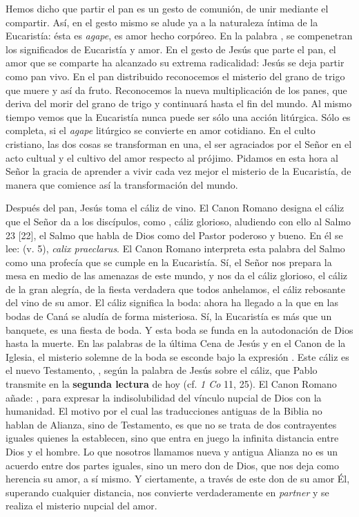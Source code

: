 \begin{body}
Hemos dicho que partir el pan es un gesto de comunión, de unir mediante el compartir. Así, en el gesto mismo se alude ya a la naturaleza íntima de la Eucaristía: ésta es \textit{agape}, es amor hecho corpóreo. En la palabra , se compenetran los significados de Eucaristía y amor. En el gesto de Jesús que parte el pan, el amor que se comparte ha alcanzado su extrema radicalidad: Jesús se deja partir como pan vivo. En el pan distribuido reconocemos el misterio del grano de trigo que muere y así da fruto. Reconocemos la nueva multiplicación de los panes, que deriva del morir del grano de trigo y continuará hasta el fin del mundo. Al mismo tiempo vemos que la Eucaristía nunca puede ser sólo una acción litúrgica. Sólo es completa, si el \textit{agape} litúrgico se convierte en amor cotidiano. En el culto cristiano, las dos cosas se transforman en una, el ser agraciados por el Señor en el acto cultual y el cultivo del amor respecto al prójimo. Pidamos en esta hora al Señor la gracia de aprender a vivir cada vez mejor el misterio de la Eucaristía, de manera que comience así la transformación del mundo.

Después del pan, Jesús toma el cáliz de vino. El Canon Romano designa el cáliz que el Señor da a los discípulos, como , cáliz glorioso, aludiendo con ello al Salmo 23 [22], el Salmo que habla de Dios como del Pastor poderoso y bueno. En él se lee:  (v. 5), \textit{calix praeclarus}. El Canon Romano interpreta esta palabra del Salmo como una profecía que se cumple en la Eucaristía. Sí, el Señor nos prepara la mesa en medio de las amenazas de este mundo, y nos da el cáliz glorioso, el cáliz de la gran alegría, de la fiesta verdadera que todos anhelamos, el cáliz rebosante del vino de su amor. El cáliz significa la boda: ahora ha llegado  a la que en las bodas de Caná se aludía de forma misteriosa. Sí, la Eucaristía es más que un banquete, es una fiesta de boda. Y esta boda se funda en la autodonación de Dios hasta la muerte. En las palabras de la última Cena de Jesús y en el Canon de la Iglesia, el misterio solemne de la boda se esconde bajo la expresión . Este cáliz es el nuevo Testamento, , según la palabra de Jesús sobre el cáliz, que Pablo transmite en la \textbf{segunda lectura} de hoy (cf. \textit{1 Co} 11, 25). El Canon Romano añade: , para expresar la indisolubilidad del vínculo nupcial de Dios con la humanidad. El motivo por el cual las traducciones antiguas de la Biblia no hablan de Alianza, sino de Testamento, es que no se trata de dos contrayentes iguales quienes la establecen, sino que entra en juego la infinita distancia entre Dios y el hombre. Lo que nosotros llamamos nueva y antigua Alianza no es un acuerdo entre dos partes iguales, sino un mero don de Dios, que nos deja como herencia su amor, a sí mismo. Y ciertamente, a través de este don de su amor Él, superando cualquier distancia, nos convierte verdaderamente en \textit{partner} y se realiza el misterio nupcial del amor.


\end{body}
